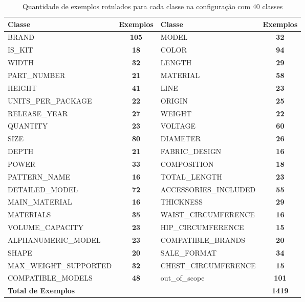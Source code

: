 \begin{table}[!htb]
\caption{Quantidade de exemplos rotulados para cada classe na configuração com 40 classes}
\label{table:divisão_de_classes}
\tiny %
\begin{tabularx}{\textwidth}{|X|c|X|c|}
 \hline
 \textbf{Classe} & \textbf{Exemplos} & \textbf{Classe} & \textbf{Exemplos} \\
 \hline
 BRAND & \textbf{105} & MODEL & \textbf{32} \\
 \hline
 IS\_KIT & \textbf{18} & COLOR & \textbf{94} \\
 \hline
 WIDTH & \textbf{32} & LENGTH & \textbf{29} \\
 \hline
 PART\_NUMBER & \textbf{21} & MATERIAL & \textbf{58} \\
 \hline
 HEIGHT & \textbf{41} & LINE & \textbf{23} \\
 \hline
 UNITS\_PER\_PACKAGE & \textbf{22} & ORIGIN & \textbf{25} \\
 \hline
 RELEASE\_YEAR & \textbf{27} & WEIGHT & \textbf{22} \\
 \hline
 QUANTITY & \textbf{23} & VOLTAGE & \textbf{60} \\
 \hline
 SIZE & \textbf{80} & DIAMETER & \textbf{26} \\
 \hline
 DEPTH & \textbf{21} & FABRIC\_DESIGN & \textbf{16} \\
 \hline
 POWER & \textbf{33} & COMPOSITION & \textbf{18} \\
 \hline
 PATTERN\_NAME & \textbf{16} & TOTAL\_LENGTH & \textbf{23} \\
 \hline
 DETAILED\_MODEL & \textbf{72} & ACCESSORIES\_INCLUDED & \textbf{55} \\
 \hline
 MAIN\_MATERIAL & \textbf{16} & THICKNESS & \textbf{29} \\
 \hline
 MATERIALS & \textbf{35} & WAIST\_CIRCUMFERENCE & \textbf{16} \\
 \hline
 VOLUME\_CAPACITY & \textbf{23} & HIP\_CIRCUMFERENCE & \textbf{15} \\
 \hline
 ALPHANUMERIC\_MODEL & \textbf{23} & COMPATIBLE\_BRANDS & \textbf{20} \\
 \hline
 SHAPE & \textbf{20} & SALE\_FORMAT & \textbf{34} \\
 \hline
 MAX\_WEIGHT\_SUPPORTED & \textbf{32} & CHEST\_CIRCUMFERENCE & \textbf{15} \\
 \hline
 COMPATIBLE\_MODELS & \textbf{48} & out\_of\_scope & \textbf{101} \\
 \hline
 \multicolumn{3}{|l|}{\textbf{Total de Exemplos}} & \textbf{1419} \\
 \hline
\end{tabularx}
\end{table}

